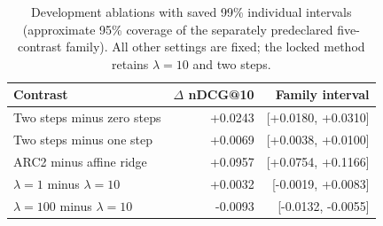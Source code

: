 \begin{table}[t]
\centering
\small
\setlength{\tabcolsep}{4pt}
\caption{Development ablations with saved 99\% individual intervals (approximate 95\% coverage of the separately predeclared five-contrast family). All other settings are fixed; the locked method retains $\lambda=10$ and two steps.}\label{tab:ablation}
\begin{tabular}{lrr}
\toprule
Contrast & $\Delta$ nDCG@10 & Family interval \\
\midrule
Two steps minus zero steps & +0.0243 & [+0.0180, +0.0310] \\
Two steps minus one step & +0.0069 & [+0.0038, +0.0100] \\
ARC2 minus affine ridge & +0.0957 & [+0.0754, +0.1166] \\
$\lambda=1$ minus $\lambda=10$ & +0.0032 & [-0.0019, +0.0083] \\
$\lambda=100$ minus $\lambda=10$ & -0.0093 & [-0.0132, -0.0055] \\
\bottomrule
\end{tabular}
\end{table}
